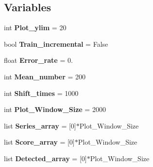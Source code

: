 \subsection*{Variables}
\begin{DoxyCompactItemize}
\item 
int {\bfseries Plot\+\_\+ylim} = 20\hypertarget{namespaceSAD_1_1Main_a194be1cda3175225c22109dba23a4142}{}\label{namespaceSAD_1_1Main_a194be1cda3175225c22109dba23a4142}

\item 
bool {\bfseries Train\+\_\+incremental} = False\hypertarget{namespaceSAD_1_1Main_a98ae0dd0686308bdb555c8867a9c347d}{}\label{namespaceSAD_1_1Main_a98ae0dd0686308bdb555c8867a9c347d}

\item 
float {\bfseries Error\+\_\+rate} = 0.\hypertarget{namespaceSAD_1_1Main_a5456dbfce839159d79b2e884585405d2}{}\label{namespaceSAD_1_1Main_a5456dbfce839159d79b2e884585405d2}

\item 
int {\bfseries Mean\+\_\+number} = 200\hypertarget{namespaceSAD_1_1Main_a4c838db683ce398fe9d7f1604777b151}{}\label{namespaceSAD_1_1Main_a4c838db683ce398fe9d7f1604777b151}

\item 
int {\bfseries Shift\+\_\+times} = 1000\hypertarget{namespaceSAD_1_1Main_a68b81e7deb40bea4e231a42e94ae84da}{}\label{namespaceSAD_1_1Main_a68b81e7deb40bea4e231a42e94ae84da}

\item 
int {\bfseries Plot\+\_\+\+Window\+\_\+\+Size} = 2000\hypertarget{namespaceSAD_1_1Main_ace720900143a1070b2e4c9e274ca116d}{}\label{namespaceSAD_1_1Main_ace720900143a1070b2e4c9e274ca116d}

\item 
list {\bfseries Series\+\_\+array} = \mbox{[}0\mbox{]}$\ast$Plot\+\_\+\+Window\+\_\+\+Size\hypertarget{namespaceSAD_1_1Main_aa4ac85bd58bc7ada91e88331bf010fc5}{}\label{namespaceSAD_1_1Main_aa4ac85bd58bc7ada91e88331bf010fc5}

\item 
list {\bfseries Score\+\_\+array} = \mbox{[}0\mbox{]}$\ast$Plot\+\_\+\+Window\+\_\+\+Size\hypertarget{namespaceSAD_1_1Main_a738a50efec4c74344d6e347fae5ea889}{}\label{namespaceSAD_1_1Main_a738a50efec4c74344d6e347fae5ea889}

\item 
list {\bfseries Detected\+\_\+array} = \mbox{[}0\mbox{]}$\ast$Plot\+\_\+\+Window\+\_\+\+Size\hypertarget{namespaceSAD_1_1Main_a6d0a457f18ca53dcd7ae7a1f72cb1407}{}\label{namespaceSAD_1_1Main_a6d0a457f18ca53dcd7ae7a1f72cb1407}


\end{DoxyCompactItemize}
